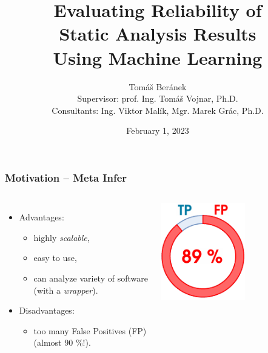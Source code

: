 \documentclass[10pt,xcolor=pdflatex,hyperref={unicode}]{beamer}
\title{Evaluating Reliability of \\ Static Analysis Results \\  Using Machine Learning}
\author[]{
Tomáš Beránek\\
\footnotesize{Supervisor: prof. Ing. Tomáš Vojnar, Ph.D.}\\
\footnotesize{Consultants: Ing. Viktor Malík, Mgr. Marek Grác, Ph.D.}
}
\institute[]{Brno University of Technology, Faculty of Information Technology}
\date{February 1, 2023}
\begin{document}
\frame[plain]{\titlepage}

\begin{frame}
  \frametitle{Motivation -- Meta Infer}
  \begin{columns}
    \doublespacing
    \begin{itemize}
        \item \large{Advantages}:
            \begin{itemize}
            \doublespacing
                \item highly \emph{scalable},
                \item easy to use,
                \item can analyze variety of software \\ (with a \emph{wrapper}).
                 \singlespacing
            \end{itemize}
        \item \large{Disadvantages}:
            \begin{itemize}
                \item too many False Positives (FP) \\ (\alert{almost 90 \%!}).
                \singlespacing
            \end{itemize}
    
    \end{itemize}
     
    \includegraphics[width=0.9\textwidth]{img/fp-rate.pdf}
  \end{columns}
\end{frame} 
\end{document}
